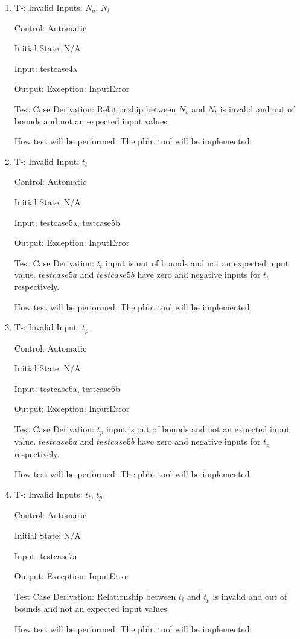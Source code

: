 \documentclass[12pt, titlepage]{article}
\newcounter{tinnum} %
\begin{document}
\begin{enumerate}
\item{T-}\thetinnum\label{T-4}: Invalid Inputs: $N_{o}$, $N_{t}$

Control: Automatic
					
Initial State: N/A
					
Input: testcase4a
					
Output: Exception: InputError

Test Case Derivation: Relationship between $N_o$ and $N_{t}$ is invalid and out 
of bounds and not an expected input values.

How test will be performed: The pbbt tool will be implemented.


\item{T-}\thetinnum\label{T-5}: Invalid Input: $t_{t}$

Control: Automatic
					
Initial State: N/A
					
Input: testcase5a, testcase5b
					
Output: Exception: InputError

Test Case Derivation: $t_{t}$ input is out of bounds and not an expected input 
value. $testcase5a$ and $testcase5b$ have zero and negative inputs for $t_{t}$ respectively. 

How test will be performed: The pbbt tool will be implemented.


\item{T-}\thetinnum\label{T-6}: Invalid Input: $t_{p}$

Control: Automatic
					
Initial State: N/A
					
Input: testcase6a, testcase6b
					
Output: Exception: InputError

Test Case Derivation: $t_{p}$ input is out of bounds and not an expected input 
value. $testcase6a$ and $testcase6b$ have zero and negative inputs for $t_{p}$ respectively. 

How test will be performed: The pbbt tool will be implemented.


\item{T-}\thetinnum\label{T-7}: Invalid Inputs: $t_{t}$, $t_{p}$

Control: Automatic
					
Initial State: N/A
					
Input: testcase7a
					
Output: Exception: InputError

Test Case Derivation: Relationship between $t_t$ and $t_{p}$ is invalid and out 
of bounds and not an expected input values.

How test will be performed: The pbbt tool will be implemented.
 

\end{enumerate}
\end{document}
